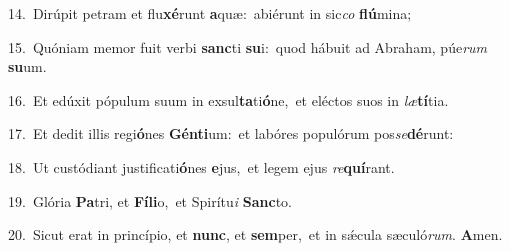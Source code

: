 {\numbfont\textcolor{\numbcolor}{14.}}~Dirúpit petram et flu\-\textbf{xé}\-runt \textbf{a}\-quæ:~\star abiérunt in sic\textit{co} \textbf{flú}\-mina;\par
{\numbfont\textcolor{\numbcolor}{15.}}~Quóniam memor fuit verbi \textbf{sanc}\-ti \textbf{su}\-i:~\star quod hábuit ad Abraham, púe\textit{rum} \textbf{su}\-um.\par
{\numbfont\textcolor{\numbcolor}{16.}}~Et edúxit pópulum suum in exsul\-\textbf{ta}\-ti\-\textbf{ó}\-ne,~\star et eléctos suos in \textit{læ}\-\textbf{tí}tia.\par
{\numbfont\textcolor{\numbcolor}{17.}}~Et dedit illis regi\-\textbf{ó}\-nes \textbf{Gén}\-\textbf{ti}um:~\star et labóres populórum pos\-\textit{se}\-\textbf{dé}runt:\par
{\numbfont\textcolor{\numbcolor}{18.}}~Ut custódiant justificati\-\textbf{ó}\-nes \textbf{e}\-jus,~\star et legem ejus \textit{re}\-\textbf{quí}rant.\par
{\numbfont\textcolor{\numbcolor}{19.}}~Glória \textbf{Pa}\-tri, et \textbf{Fí}\-\textbf{li}o,~\star et Spirítu\textit{i} \textbf{Sanc}\-to.\par
{\numbfont\textcolor{\numbcolor}{20.}}~Sicut erat in princípio, et \textbf{nunc}\-, et \textbf{sem}\-per,~\star et in sǽcula sæculó\-\textit{rum}\-. \textbf{A}\-men.\par
